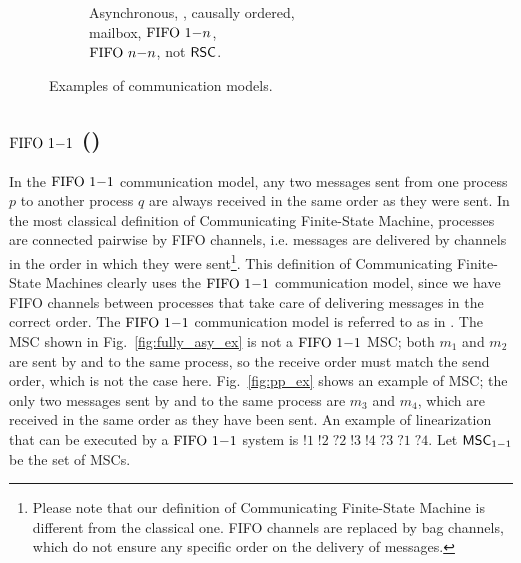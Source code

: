\begin{figure}[t]
\begin{subfigure}[t]{0.3\textwidth}
		\caption{Asynchronous, \pp, causally ordered, \\mailbox, $\text{FIFO } 1\mathsf{-}n$, \\$\text{FIFO } n\mathsf{-}n$, not $\mathsf{RSC}$.}
	\end{subfigure}
		\caption{Examples of communication models.}
	    \label{fig:co_ex}
\end{figure}

\subsection{$\text{FIFO } 1\mathsf{-}1$ (\pp)}
In the $\text{FIFO } 1\mathsf{-}1$ communication model, any two messages sent from one process $p$ to another process $q$ are always received in the same order as they were sent. In the most classical definition of Communicating Finite-State Machine, processes are connected pairwise by FIFO channels, i.e. messages are delivered by channels in the order in which they were sent\footnote{Please note that our definition of Communicating Finite-State Machine is different from the classical one. FIFO channels are replaced by bag channels, which do not ensure any specific order on the delivery of messages.}. This definition of Communicating Finite-State Machines clearly uses the $\text{FIFO } 1\mathsf{-}1$ communication model, since we have FIFO channels between processes that take care of delivering messages in the correct order. The $\text{FIFO } 1\mathsf{-}1$ communication model is referred to as \pp in \cite{DBLP:conf/concur/BolligGFLLS21}. The MSC shown in Fig.~\ref{fig:fully_asy_ex} is not a $\text{FIFO } 1\mathsf{-}1$ MSC; both $m_1$ and $m_2$ are sent by and to the same process, so the receive order must match the send order, which is not the case here. Fig.~\ref{fig:pp_ex} shows an example of \pp MSC; the only two messages sent by and to the same process are $m_3$ and $m_4$, which are received in the same order as they have been sent. An example of linearization that can be executed by a $\text{FIFO } 1\mathsf{-}1$ system is $!1\;!2\;?2\;!3\;!4\;?3\;?1\;?4$. Let $\mathsf{MSC}_{1\mathsf{-}1}$ be the set of \pp MSCs.




